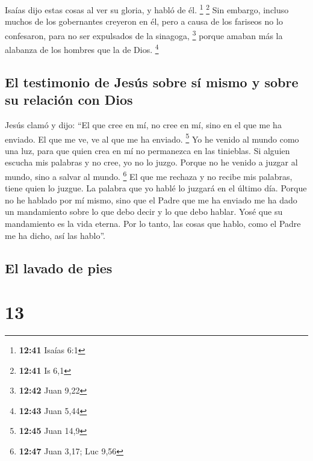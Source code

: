  Isaías dijo estas cosas al ver su gloria, y habló de él.
\footnote{\textbf{12:41} Isaías 6:1} \footnote{\textbf{12:41} Is 6,1}
 Sin embargo, incluso muchos de los gobernantes creyeron
en él, pero a causa de los fariseos no lo confesaron, para no ser
expulsados de la sinagoga, \footnote{\textbf{12:42} Juan 9,22}
 porque amaban más la alabanza de los hombres que la de
Dios. \footnote{\textbf{12:43} Juan 5,44}

\hypertarget{el-testimonio-de-jesuxfas-sobre-suxed-mismo-y-sobre-su-relaciuxf3n-con-dios}{%
\subsection{El testimonio de Jesús sobre sí mismo y sobre su relación
con
Dios}\label{el-testimonio-de-jesuxfas-sobre-suxed-mismo-y-sobre-su-relaciuxf3n-con-dios}}

 Jesús clamó y dijo: ``El que cree en mí, no cree en mí,
sino en el que me ha enviado.  El que me ve, ve al que me
ha enviado. \footnote{\textbf{12:45} Juan 14,9}  Yo he
venido al mundo como una luz, para que quien crea en mí no permanezca en
las tinieblas.  Si alguien escucha mis palabras y no
cree, yo no lo juzgo. Porque no he venido a juzgar al mundo, sino a
salvar al mundo. \footnote{\textbf{12:47} Juan 3,17; Luc 9,56}
 El que me rechaza y no recibe mis palabras, tiene quien
lo juzgue. La palabra que yo hablé lo juzgará en el último día.
 Porque no he hablado por mí mismo, sino que el Padre que
me ha enviado me ha dado un mandamiento sobre lo que debo decir y lo que
debo hablar.  Yosé que su mandamiento es la vida eterna.
Por lo tanto, las cosas que hablo, como el Padre me ha dicho, así las
hablo''.

\hypertarget{el-lavado-de-pies}{%
\subsection{El lavado de pies}\label{el-lavado-de-pies}}

\hypertarget{section-12}{%
\section{13}\label{section-12}}

